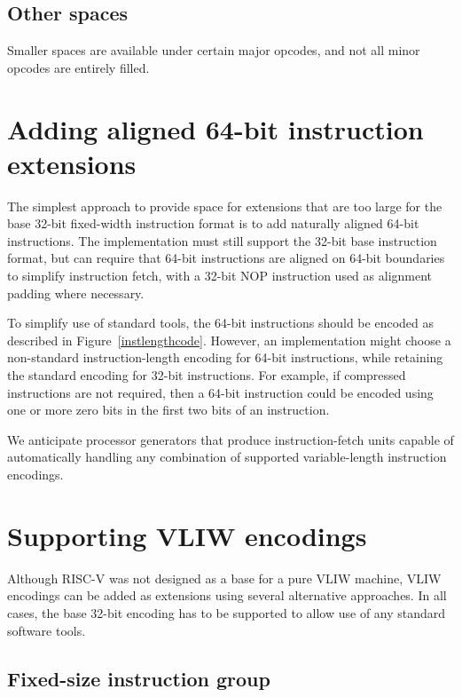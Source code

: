 \subsection*{Other spaces}

Smaller spaces are available under certain major opcodes, and not all
minor opcodes are entirely filled.

\section{Adding aligned 64-bit instruction extensions}

The simplest approach to provide space for extensions that are too
large for the base 32-bit fixed-width instruction format is to add
naturally aligned 64-bit instructions.  The implementation must still
support the 32-bit base instruction format, but can require that
64-bit instructions are aligned on 64-bit boundaries to simplify
instruction fetch, with a 32-bit NOP instruction used as alignment
padding where necessary.

To simplify use of standard tools, the 64-bit instructions should be
encoded as described in Figure~\ref{instlengthcode}.  However, an
implementation might choose a non-standard instruction-length encoding
for 64-bit instructions, while retaining the standard encoding for
32-bit instructions.  For example, if compressed instructions are not
required, then a 64-bit instruction could be encoded using one or more
zero bits in the first two bits of an instruction.

\begin{commentary}
We anticipate processor generators that produce instruction-fetch
units capable of automatically handling any combination of supported
variable-length instruction encodings.
\end{commentary}

\section{Supporting VLIW encodings}

Although RISC-V was not designed as a base for a pure VLIW machine,
VLIW encodings can be added as extensions using several alternative
approaches. In all cases, the base 32-bit encoding has to be supported
to allow use of any standard software tools.

\subsection*{Fixed-size instruction group}

